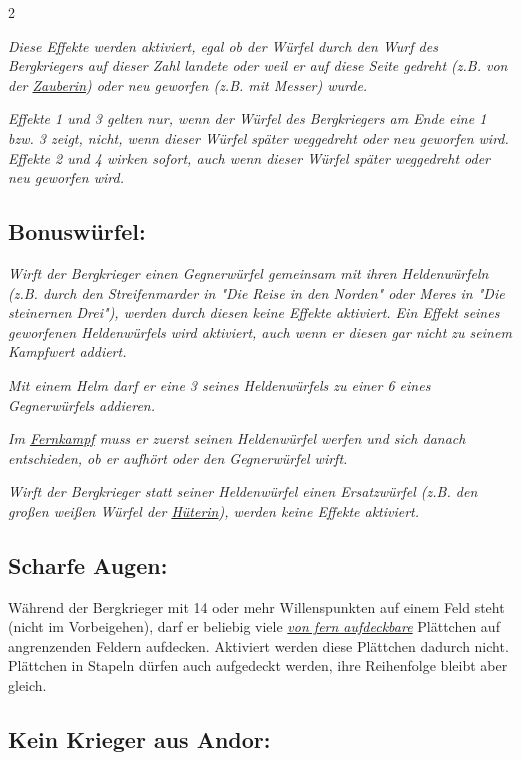 \documentclass[10pt, a4paper, oneside]{book}
\newcommand{\fan}[1]{\textit{#1}}
\begin{document}
\begin{multicols*}{2}
\begin{nobgcolor}
\fan{Diese Effekte werden aktiviert, egal ob der Würfel durch den Wurf des Bergkriegers auf dieser Zahl landete oder weil er auf diese Seite gedreht (z.B. von der \hyperref[Zauberin]{Zauberin}) oder neu geworfen (z.B. mit Messer) wurde.}

\fan{Effekte 1 und 3 gelten nur, wenn der Würfel des Bergkriegers am Ende eine 1 bzw. 3 zeigt, nicht, wenn dieser Würfel später weggedreht oder neu geworfen wird. Effekte 2 und 4 wirken sofort, auch wenn dieser Würfel später weggedreht oder neu geworfen wird.}





\subsection{Bonuswürfel:}


\fan{Wirft der Bergkrieger einen Gegnerwürfel gemeinsam mit ihren Heldenwürfeln (z.B. durch den Streifenmarder in "Die Reise in den Norden" oder Meres in "Die steinernen Drei"), werden durch diesen keine Effekte aktiviert. Ein Effekt seines geworfenen Heldenwürfels wird aktiviert, auch wenn er diesen gar nicht zu seinem Kampfwert addiert.}

\fan{Mit einem Helm darf er eine 3 seines Heldenwürfels zu einer 6 eines Gegnerwürfels addieren.}

\fan{Im \hyperref[Fernkämpfer]{Fernkampf} muss er zuerst seinen Heldenwürfel werfen und sich danach entschieden, ob er aufhört oder den Gegnerwürfel wirft.}

\fan{Wirft der Bergkrieger statt seiner Heldenwürfel einen Ersatzwürfel (z.B. den großen weißen Würfel der \hyperref[Hüterin]{Hüterin}), werden keine Effekte aktiviert.}



\columnbreak

\subsection{Scharfe Augen:}

Während der Bergkrieger mit 14 oder mehr Willenspunkten auf einem Feld steht (nicht im Vorbeigehen), darf er beliebig viele \hyperref[Aufdecken]{\fan{von fern aufdeckbare}} Plättchen auf angrenzenden Feldern aufdecken. Aktiviert werden diese Plättchen dadurch nicht. Plättchen in Stapeln dürfen auch aufgedeckt werden, ihre Reihenfolge bleibt aber gleich.
\supercite{BL_BdM:A3_en}


\subsection{Kein Krieger aus Andor:}


\end{nobgcolor}
\end{multicols*}
\end{document}
